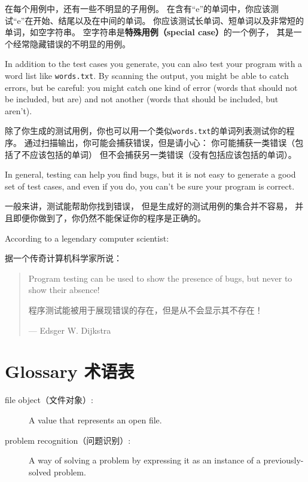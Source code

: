 \documentclass[10pt]{book}
\begin{document}
\begin{CJK}{UTF8}{gbsn}
在每个用例中，还有一些不明显的子用例。
在含有``e''的单词中，你应该测试``e''在开始、结尾以及在中间的单词。
你应该测试长单词、短单词以及非常短的单词，如空字符串。
空字符串是{\bf 特殊用例（special case）}的一个例子，
其是一个经常隐藏错误的不明显的用例。

In addition to the test cases you generate, you can also test
your program with a word list like {\tt words.txt}.  By scanning
the output, you might be able to catch errors, but be careful:
you might catch one kind of error (words that should not be
included, but are) and not another (words that should be included,
but aren't).

除了你生成的测试用例，你也可以用一个类似{\tt words.txt}的单词列表测试你的程序。
通过扫描输出，你可能会捕获错误，但是请小心：
你可能捕获一类错误（包括了不应该包括的单词）
但不会捕获另一类错误（没有包括应该包括的单词）。

In general, testing can help you find bugs, but it is not easy to
generate a good set of test cases, and even if you do, you can't
be sure your program is correct.

一般来讲，测试能帮助你找到错误，
但是生成好的测试用例的集合并不容易，
并且即便你做到了，你仍然不能保证你的程序是正确的。

According to a legendary computer scientist:

据一个传奇计算机科学家所说：

\begin{quote}
Program testing can be used to show the presence of bugs, but never to
show their absence!

程序测试能被用于展现错误的存在，但是从不会显示其不存在！

--- Edsger W. Dijkstra
\end{quote}


\section{Glossary 术语表}

\begin{description}

\item[file object（文件对象）:] A value that represents an open file.

\item[problem recognition（问题识别）:] A way of solving a problem by
expressing it as an instance of a previously-solved problem.


\end{description}
\end{CJK}
\end{document}
